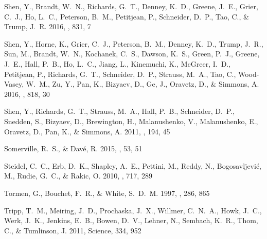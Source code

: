 \documentclass[iop]{emulateapj}
\begin{document}
\begin{thebibliography}{46}
{Shen}, Y., {Brandt}, W.~N., {Richards}, G.~T., {Denney}, K.~D., {Greene},
  J.~E., {Grier}, C.~J., {Ho}, L.~C., {Peterson}, B.~M., {Petitjean}, P.,
  {Schneider}, D.~P., {Tao}, C., \& {Trump}, J.~R. 2016{}, \apj,
  831, 7

{Shen}, Y., {Horne}, K., {Grier}, C.~J., {Peterson}, B.~M., {Denney}, K.~D.,
  {Trump}, J.~R., {Sun}, M., {Brandt}, W.~N., {Kochanek}, C.~S., {Dawson},
  K.~S., {Green}, P.~J., {Greene}, J.~E., {Hall}, P.~B., {Ho}, L.~C., {Jiang},
  L., {Kinemuchi}, K., {McGreer}, I.~D., {Petitjean}, P., {Richards}, G.~T.,
  {Schneider}, D.~P., {Strauss}, M.~A., {Tao}, C., {Wood-Vasey}, W.~M., {Zu},
  Y., {Pan}, K., {Bizyaev}, D., {Ge}, J., {Oravetz}, D., \& {Simmons}, A.
  2016{}, \apj, 818, 30

{Shen}, Y., {Richards}, G.~T., {Strauss}, M.~A., {Hall}, P.~B., {Schneider},
  D.~P., {Snedden}, S., {Bizyaev}, D., {Brewington}, H., {Malanushenko}, V.,
  {Malanushenko}, E., {Oravetz}, D., {Pan}, K., \& {Simmons}, A. 2011, \apjs,
  194, 45

{Somerville}, R.~S., \& {Dav{\'e}}, R. 2015, \araa, 53, 51

{Steidel}, C.~C., {Erb}, D.~K., {Shapley}, A.~E., {Pettini}, M., {Reddy}, N.,
  {Bogosavljevi{\'c}}, M., {Rudie}, G.~C., \& {Rakic}, O. 2010, \apj, 717, 289

{Tormen}, G., {Bouchet}, F.~R., \& {White}, S.~D.~M. 1997, \mnras, 286, 865

{Tripp}, T.~M., {Meiring}, J.~D., {Prochaska}, J.~X., {Willmer}, C.~N.~A.,
  {Howk}, J.~C., {Werk}, J.~K., {Jenkins}, E.~B., {Bowen}, D.~V., {Lehner}, N.,
  {Sembach}, K.~R., {Thom}, C., \& {Tumlinson}, J. 2011, Science, 334, 952


\end{thebibliography}
\end{document}
